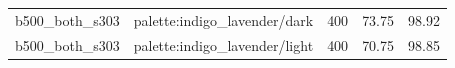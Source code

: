 \begin{longtable}{l>{\raggedright\arraybackslash}p{.42\linewidth}rrr}
b500\_\allowbreak{}both\_\allowbreak{}s303 & %
palette:indigo\_\allowbreak{}lavender/dark & %
400 & %
73.75 & %
98.92 \\ %

b500\_\allowbreak{}both\_\allowbreak{}s303 & %
palette:indigo\_\allowbreak{}lavender/light & %
400 & %
70.75 & %
98.85 \\ %


\end{longtable}
